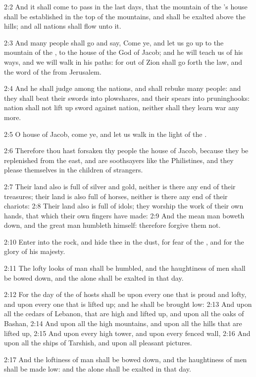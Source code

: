 2:2 And it shall come to pass in the last days, that the mountain of
the \LORD's house shall be established in the top of the mountains, and
shall be exalted above the hills; and all nations shall flow unto it.

2:3 And many people shall go and say, Come ye, and let us go up to the
mountain of the \LORD, to the house of the God of Jacob; and he will
teach us of his ways, and we will walk in his paths: for out of Zion
shall go forth the law, and the word of the \LORD from Jerusalem.

2:4 And he shall judge among the nations, and shall rebuke many
people: and they shall beat their swords into plowshares, and their
spears into pruninghooks: nation shall not lift up sword against
nation, neither shall they learn war any more.

2:5 O house of Jacob, come ye, and let us walk in the light of the
\LORD.

2:6 Therefore thou hast forsaken thy people the house of Jacob,
because they be replenished from the east, and are soothsayers like
the Philistines, and they please themselves in the children of
strangers.

2:7 Their land also is full of silver and gold, neither is there any
end of their treasures; their land is also full of horses, neither is
there any end of their chariots: 2:8 Their land also is full of idols;
they worship the work of their own hands, that which their own fingers
have made: 2:9 And the mean man boweth down, and the great man
humbleth himself: therefore forgive them not.

2:10 Enter into the rock, and hide thee in the dust, for fear of the
\LORD, and for the glory of his majesty.

2:11 The lofty looks of man shall be humbled, and the haughtiness of
men shall be bowed down, and the \LORD alone shall be exalted in that
day.

2:12 For the day of the \LORD of hosts shall be upon every one that is
proud and lofty, and upon every one that is lifted up; and he shall be
brought low: 2:13 And upon all the cedars of Lebanon, that are high
and lifted up, and upon all the oaks of Bashan, 2:14 And upon all the
high mountains, and upon all the hills that are lifted up, 2:15 And
upon every high tower, and upon every fenced wall, 2:16 And upon all
the ships of Tarshish, and upon all pleasant pictures.

2:17 And the loftiness of man shall be bowed down, and the haughtiness
of men shall be made low: and the \LORD alone shall be exalted in that
day.


